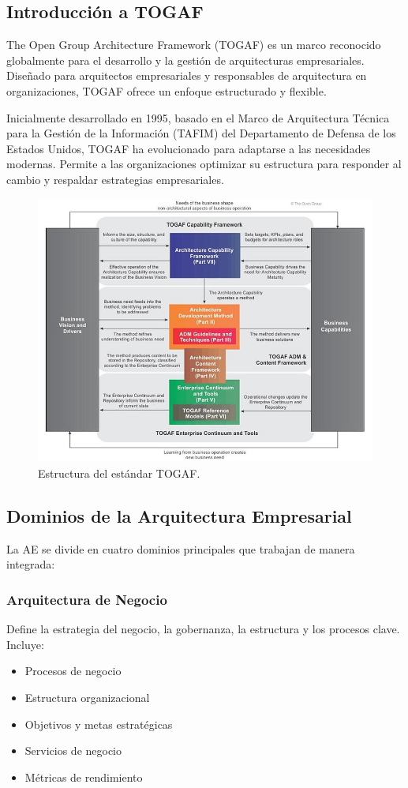 \subsection{Introducción a TOGAF}

The Open Group Architecture Framework (TOGAF) es un marco reconocido globalmente para el desarrollo y la gestión de arquitecturas empresariales. Diseñado para arquitectos empresariales y responsables de arquitectura en organizaciones, TOGAF ofrece un enfoque estructurado y flexible.

Inicialmente desarrollado en 1995, basado en el Marco de Arquitectura Técnica para la Gestión de la Información (TAFIM) del Departamento de Defensa de los Estados Unidos, TOGAF ha evolucionado para adaptarse a las necesidades modernas. Permite a las organizaciones optimizar su estructura para responder al cambio y respaldar estrategias empresariales.

\begin{figure}[h]
\centering
\includegraphics[scale=0.6]{Pictures/togaf.jpg}
\caption{Estructura del estándar TOGAF.}
\label{fig:togaf_structure}
\end{figure}

\subsection{Dominios de la Arquitectura Empresarial}

La AE se divide en cuatro dominios principales que trabajan de manera integrada:

\subsubsection{Arquitectura de Negocio}
Define la estrategia del negocio, la gobernanza, la estructura y los procesos clave. Incluye:
\begin{itemize}
\item Procesos de negocio
\item Estructura organizacional
\item Objetivos y metas estratégicas
\item Servicios de negocio
\item Métricas de rendimiento
\end{itemize}

